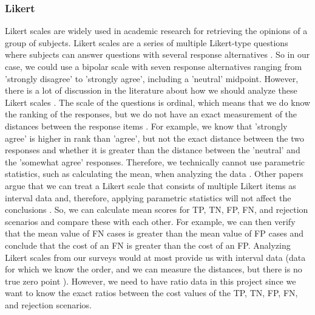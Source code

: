 \documentclass[a4paper]{article}
\begin{document}
\subsubsection{Likert}
\label{sec:likert}
Likert scales are widely used in academic research for retrieving the opinions of a group of subjects. Likert scales are a series of multiple Likert-type questions where subjects can answer questions with several response alternatives \cite{boone2012analyzing}. So in our case, we could use a bipolar scale with seven response alternatives ranging from 'strongly disagree' to 'strongly agree', including a 'neutral' midpoint. However, there is a lot of discussion in the literature about how we should analyze these Likert scales \cite{boone2012analyzing, allen2007likert, norman2010likert, murray2013likert}. The scale of the questions is ordinal, which means that we do know the ranking of the responses, but we do not have an exact measurement of the distances between the response items \cite{allen2007likert}. For example, we know that 'strongly agree' is higher in rank than 'agree', but not the exact distance between the two responses and whether it is greater than the distance between the 'neutral' and the 'somewhat agree' responses. Therefore, we technically cannot use parametric statistics, such as calculating the mean, when analyzing the data \cite{allen2007likert}. Other papers argue that we can treat a Likert scale that consists of multiple Likert items as interval data and, therefore, applying parametric statistics will not affect the conclusions \cite{boone2012analyzing, norman2010likert, murray2013likert}. So, we can calculate mean scores for TP, TN, FP, FN, and rejection scenarios and compare these with each other. For example, we can then verify that the mean value of FN cases is greater than the mean value of FP cases and conclude that the cost of an FN is greater than the cost of an FP. Analyzing Likert scales from our surveys would at most provide us with interval data (data for which we know the order, and we can measure the distances, but there is no true zero point \cite{allen2007likert}). However, we need to have ratio data in this project since we want to know the exact ratios between the cost values of the TP, TN, FP, FN, and rejection scenarios.
\end{document}
